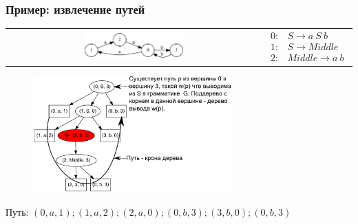 \documentclass{beamer}
\begin{document}
\begin{frame}[fragile]
  \transwipe[direction=90]
  \frametitle{Пример: извлечение путей}
\begin{center}
\begin{tabular}{  c  c  }
    \includegraphics[width=0.4\textwidth]{pictures/input.pdf}
    &
$
 
\begin{array}{rl} 
   0:& S \rightarrow a \ S \ b \\
   1:& S \rightarrow Middle \\
   2:& Middle \rightarrow a \ b
\end{array}

$
\end{tabular}

\begin{figure}[ht]
    \centering
        \includegraphics[width=0.68\textwidth]{pictures/AnBn_2_m.pdf}      
\end{figure}
Путь: $(0,a,1);(1,a,2);(2,a,0);(0,b,3);(3,b,0);(0,b,3)$
\end{center}                
\end{frame}
\end{document}
